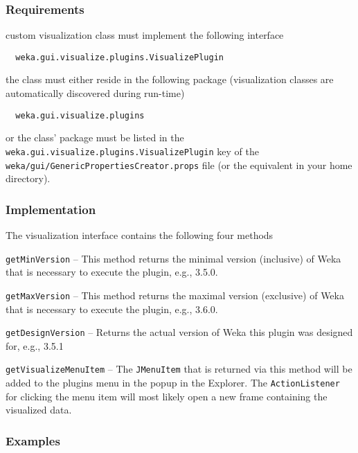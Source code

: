 \subsubsection*{Requirements}
\begin{tight_itemize}
  \item custom visualization class must implement the following interface
  \begin{verbatim}
  weka.gui.visualize.plugins.VisualizePlugin
  \end{verbatim}
  
  \item the class must either reside in the following package (visualization
classes are automatically discovered during run-time)
  \begin{verbatim}
  weka.gui.visualize.plugins
  \end{verbatim}
  
  \item or the class' package must be listed in the
\texttt{weka.gui.visualize.plugins.VisualizePlugin} key of the
\texttt{weka/gui/GenericPropertiesCreator.props} file (or the equivalent in
your home directory).
\end{tight_itemize}

\subsubsection*{Implementation}
The visualization interface contains the following four methods
\begin{tight_itemize}
  \item \texttt{getMinVersion} -- This method returns the minimal version
(inclusive) of Weka that is necessary to execute the plugin, e.g., 3.5.0.
  \item \texttt{getMaxVersion} -- This method returns the maximal version
(exclusive) of Weka that is necessary to execute the plugin, e.g., 3.6.0.
  \item \texttt{getDesignVersion} -- Returns the actual version of Weka
this plugin was designed for, e.g., 3.5.1
  \item \texttt{getVisualizeMenuItem} -- The \texttt{JMenuItem} that is returned
via this method will be added to the plugins menu in the popup in the Explorer.
The \texttt{ActionListener} for clicking the menu item will most likely open a
new frame containing the visualized data.
\end{tight_itemize}

\newpage
\subsubsection*{Examples}
